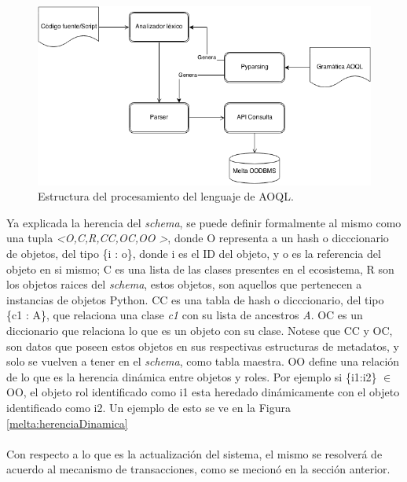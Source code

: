 \documentclass{melta}
\begin{document}
\begin{figure}
\centering
\includegraphics[scale=0.5]{MeltaAOQL}
\caption{Estructura del procesamiento del lenguaje de AOQL.}
\label{melta:aoql}
\end{figure}

Ya explicada la herencia del \textit{schema}, se puede definir formalmente al mismo como una tupla \newline \textit{\textless O,C,R,CC,OC,OO \textgreater}, donde O representa a un hash o dicccionario de objetos, del tipo \{i : o\}, donde i es el ID del objeto, y o es la referencia del objeto en si mismo; C es una lista de las clases presentes en el ecosistema, R son los objetos raices del \textit{schema}, estos objetos, son aquellos que pertenecen a instancias de objetos Python. CC es una tabla de hash o dicccionario, del tipo \{c1 : A\}, que relaciona una clase \textit{c1} con su lista de ancestros \textit{A}. OC es un diccionario que relaciona lo que es un objeto con su clase. Notese que CC y OC, son datos que poseen estos objetos en sus respectivas estructuras de metadatos, y solo se vuelven a tener en el \textit{schema}, como tabla maestra. OO define una relación de lo que es la herencia dinámica entre objetos y roles. Por ejemplo si \{i1:i2\} 
\begin{math}
 \in
\end{math} OO, el objeto rol identificado como i1 esta heredado dinámicamente con el objeto identificado como i2. Un ejemplo de esto se ve en la Figura \ref{melta:herenciaDinamica}
\\\\
Con respecto a lo que es la actualización del sistema, el mismo se resolverá de acuerdo al mecanismo de transacciones, como se mecionó en la sección anterior. 
\end{document}
